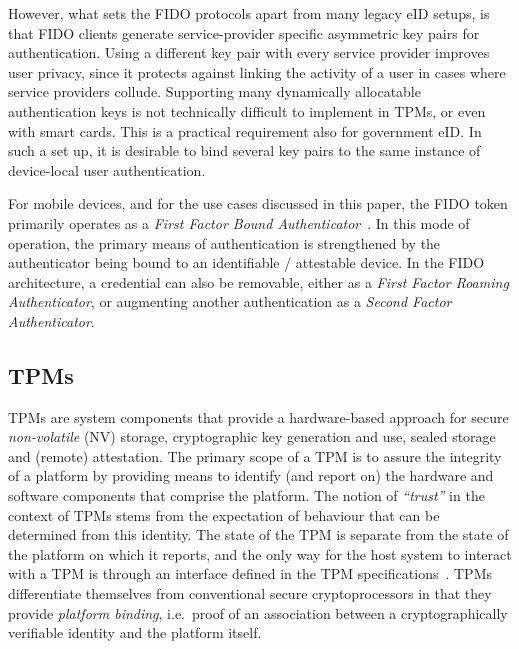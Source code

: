 \documentclass{sig-alternate-2013}
\def\istechreport{1}
\begin{document}
However, what sets the FIDO protocols apart from many legacy eID setups, is that
FIDO clients generate service-provider specific asymmetric key pairs for
authentication. Using a different key pair with every service provider improves
user privacy, since it protects against linking the activity of a user in cases
where service providers collude. Supporting many dynamically allocatable
authentication keys is not technically difficult to implement in TPMs, or even
with smart cards. This is a practical requirement also for government eID. In
such a set up, it is desirable to bind several key pairs to the same instance of
device-local user authentication.

\ifdefined\istechreport
For mobile devices, and for the use cases discussed in this paper, the FIDO
token primarily operates as a \textit{First Factor Bound
Authenticator}~\cite{Lindeman14}. In this mode of operation, the primary means of
authentication is strengthened by the authenticator being bound to an
identifiable / attestable device. In the FIDO architecture, a credential can
also be removable, either as a \textit{First Factor Roaming Authenticator}, or
augmenting another authentication as a \textit{Second Factor Authenticator}.
\fi

\subsection{TPMs}

TPMs are system components that provide a hardware-based approach for secure
\emph{non-volatile} (NV) storage, cryptographic key generation and use, sealed
storage and (remote) attestation. The primary scope of a TPM is to assure the
integrity of a platform by providing means to identify (and report on) the
hardware and software components that comprise the platform. The notion of
\emph{``trust''} in the context of TPMs stems from the expectation of behaviour
that can be determined from this identity. The state of the TPM is separate from
the state of the platform on which it reports, and the only way for the host
system to interact with a TPM is through an interface defined in the TPM
specifications~\cite{TPM1.2,TPM2.0}. TPMs differentiate themselves from
conventional secure cryptoprocessors in that they provide \emph{platform
binding}, i.e.\ proof of an association between a cryptographically verifiable
identity and the platform itself.
\end{document}
